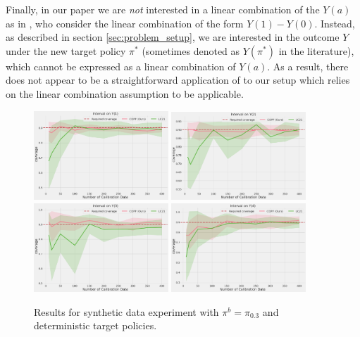 Finally, in our paper we are \emph{not} interested in a linear combination of the $Y(a)$ as in \cite{lei2020conformal}, who consider the linear combination of the form $Y(1)-Y(0)$. Instead, as described in section \ref{sec:problem_setup}, we are interested in the outcome $Y$ under the new target policy $\pi^*$ (sometimes denoted as $Y(\pi^*)$ in the literature), which cannot be expressed as a linear combination of $Y(a)$. As a result, there does not appear to be a straightforward application of \cite[Section 4.3]{lei2020conformal} to our setup which relies on the linear combination assumption to be applicable.

\begin{figure}[t]
    \centering
    \includegraphics[width=0.45\textwidth, height=0.3\textwidth]{figures/copp/outcome_1.png}
    \includegraphics[width=0.45\textwidth, height=0.3\textwidth]{figures/copp/outcome_2.png}\\
    \includegraphics[width=0.45\textwidth, height=0.3\textwidth]{figures/copp/outcome_3.png}
    \includegraphics[width=0.45\textwidth, height=0.3\textwidth]{figures/copp/outcome_4.png}
    \caption{Results for synthetic data experiment with $\pi^b = \pi_{0.3}$ and deterministic target policies.}
    \label{fig:comp_lc}
\end{figure}
